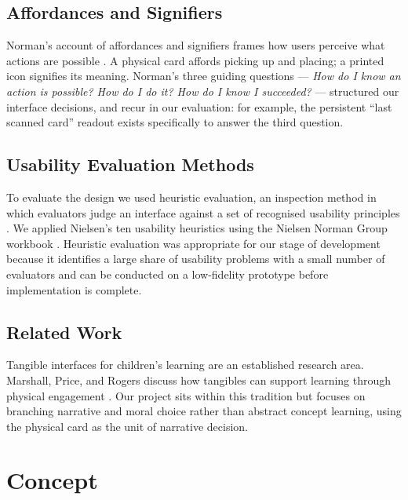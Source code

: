 \subsection{Affordances and Signifiers}
Norman's account of affordances and signifiers frames how users perceive what
actions are possible \cite{norman2013everyday}. A physical card affords
picking up and placing; a printed icon signifies its meaning. Norman's three
guiding questions --- \emph{How do I know an action is possible? How do I do
it? How do I know I succeeded?} --- structured our interface decisions, and
recur in our evaluation: for example, the persistent ``last scanned card''
readout exists specifically to answer the third question.

\subsection{Usability Evaluation Methods}
To evaluate the design we used heuristic evaluation, an inspection method in
which evaluators judge an interface against a set of recognised usability
principles \cite{nielsen1990heuristic}. We applied Nielsen's ten usability
heuristics \cite{nielsen1994heuristics} using the Nielsen Norman Group
workbook \cite{nngroup_workbook}. Heuristic evaluation was appropriate for
our stage of development because it identifies a large share of usability
problems with a small number of evaluators and can be conducted on a
low-fidelity prototype before implementation is complete.

\subsection{Related Work}
Tangible interfaces for children's learning are an established research area.
Marshall, Price, and Rogers discuss how tangibles can support learning
through physical engagement \cite{marshall2003tangible}. Our project sits
within this tradition but focuses on branching narrative and moral choice
rather than abstract concept learning, using the physical card as the unit
of narrative decision.

\section{Concept}

